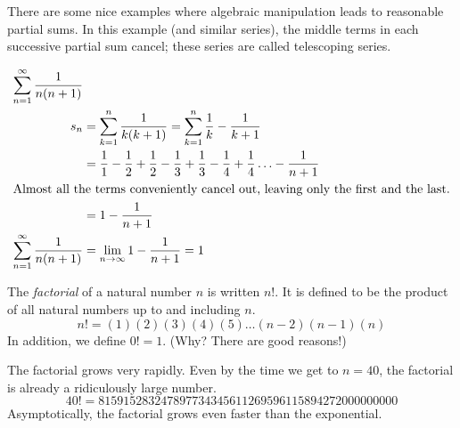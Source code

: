 \documentclass[fleqn,letterpaper]{report}
\begin{document}
\begin{example}There are some nice examples where algebraic manipulation
leads to reasonable partial sums. In this example (and similar
series), the middle terms in each successive partial sum
cancel; these series are called telescoping series.

\begin{align*}
\sum_{n=1}^\infty \frac{1}{n(n+1)} & \\
s_n & = \sum_{k=1}^n \frac{1}{k(k+1)} = \sum_{k=1}^n \frac{1}{k} -
\frac{1}{k+1} \\
& = \frac{1}{1} - \frac{1}{2} + \frac{1}{2} - \frac{1}{3} +
\frac{1}{3} - \frac{1}{4} + \frac{1}{4} \ldots - \frac{1}{n+1}
\\
\intertext{Almost all the terms conveniently cancel out,
leaving only the first and the last.}
& = 1 - \frac{1}{n+1} \\
\sum_{n=1}^\infty \frac{1}{n(n+1)} & = \lim_{n \rightarrow
\infty} 1 - \frac{1}{n+1} = 1 
\end{align*}
\end{example}

\begin{defn}
The \emph{factorial} of a natural number $n$ is written $n!$.
It is defined to be the product of all natural numbers up to
and including $n$.
\begin{equation*}
n! = (1)(2)(3)(4)(5)\ldots(n-2)(n-1)(n)
\end{equation*}
In addition, we define $0! = 1$. (Why? There are good
reasons!) 
\end{defn}

The factorial grows very rapidly. Even by the time we get to
$n=40$, the factorial is already a ridiculously large number. 
\begin{equation*}
40! =815915283247897734345611269596115894272000000000
\end{equation*}
Asymptotically, the factorial grows even faster than the
exponential. 
\end{document}
